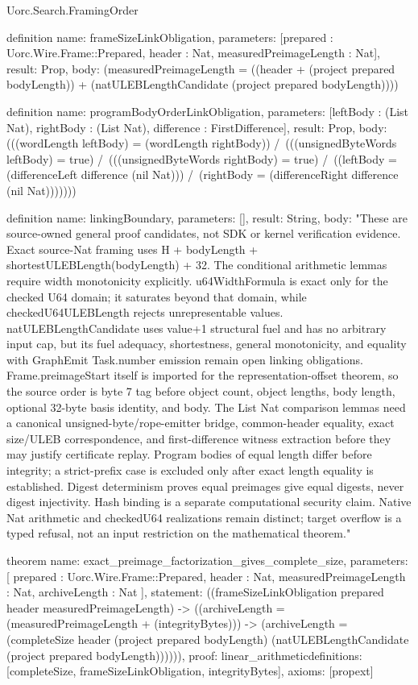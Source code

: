 \begin{lexlean}{Uorc.Search.FramingOrder}
\begin{semanticmodule}
definition{
  name: frameSizeLinkObligation,
  parameters: [prepared : Uorc.Wire.Frame::Prepared, header : Nat, measuredPreimageLength : Nat],
  result: Prop,
  body: (measuredPreimageLength = ((header + (project prepared bodyLength)) + (natULEBLengthCandidate (project prepared bodyLength))))
}

definition{
  name: programBodyOrderLinkObligation,
  parameters: [leftBody : (List Nat), rightBody : (List Nat), difference : FirstDifference],
  result: Prop,
  body: (((wordLength leftBody) = (wordLength rightBody)) /\ (((unsignedByteWords leftBody) = true) /\ (((unsignedByteWords rightBody) = true) /\ ((leftBody = (differenceLeft difference (nil Nat))) /\ (rightBody = (differenceRight difference (nil Nat)))))))
}

definition{
  name: linkingBoundary,
  parameters: [],
  result: String,
  body: "These are source-owned general proof candidates, not SDK or kernel verification evidence. Exact source-Nat framing uses H + bodyLength + shortestULEBLength(bodyLength) + 32. The conditional arithmetic lemmas require width monotonicity explicitly. u64WidthFormula is exact only for the checked U64 domain; it saturates beyond that domain, while checkedU64ULEBLength rejects unrepresentable values. natULEBLengthCandidate uses value+1 structural fuel and has no arbitrary input cap, but its fuel adequacy, shortestness, general monotonicity, and equality with GraphEmit Task.number emission remain open linking obligations. Frame.preimageStart itself is imported for the representation-offset theorem, so the source order is byte 7 tag before object count, object lengths, body length, optional 32-byte basis identity, and body. The List Nat comparison lemmas need a canonical unsigned-byte/rope-emitter bridge, common-header equality, exact size/ULEB correspondence, and first-difference witness extraction before they may justify certificate replay. Program bodies of equal length differ before integrity; a strict-prefix case is excluded only after exact length equality is established. Digest determinism proves equal preimages give equal digests, never digest injectivity. Hash binding is a separate computational security claim. Native Nat arithmetic and checkedU64 realizations remain distinct; target overflow is a typed refusal, not an input restriction on the mathematical theorem."
}

theorem{
  name: exact_preimage_factorization_gives_complete_size,
  parameters: [
    prepared : Uorc.Wire.Frame::Prepared,
    header : Nat,
    measuredPreimageLength : Nat,
    archiveLength : Nat
  ],
  statement: ((frameSizeLinkObligation prepared header measuredPreimageLength) -> ((archiveLength = (measuredPreimageLength + (integrityBytes))) -> (archiveLength = (completeSize header (project prepared bodyLength) (natULEBLengthCandidate (project prepared bodyLength)))))),
  proof: linear_arithmetic{definitions: [completeSize, frameSizeLinkObligation, integrityBytes]},
  axioms: [propext]
}


\end{semanticmodule}
\end{lexlean}
